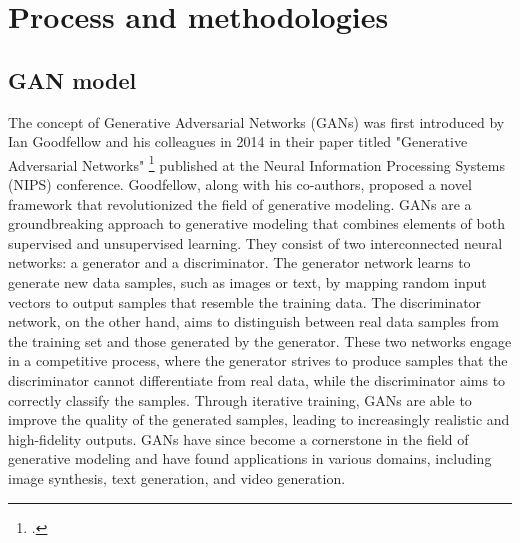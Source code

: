 \chapter{Process and methodologies}
\label{cap:process-methodologies}

\section{GAN model}
\label{sec:gan-model}
The concept of Generative Adversarial Networks (GANs) was first introduced by Ian Goodfellow and his colleagues in 2014 in their paper titled "Generative Adversarial Networks" \footcite{paper:ganpaper} published at the Neural Information Processing Systems (NIPS) conference. 
Goodfellow, along with his co-authors, proposed a novel framework that revolutionized the field of generative modeling. 
GANs are a groundbreaking approach to generative modeling that combines elements of both supervised and unsupervised learning. They consist of two interconnected neural networks: a generator and a discriminator. 
The generator network learns to generate new data samples, such as images or text, by mapping random input vectors to output samples that resemble the training data. 
The discriminator network, on the other hand, aims to distinguish between real data samples from the training set and those generated by the generator. 
These two networks engage in a competitive process, where the generator strives to produce samples that the discriminator cannot differentiate from real data, while the discriminator aims to correctly classify the samples. 
Through iterative training, GANs are able to improve the quality of the generated samples, leading to increasingly realistic and high-fidelity outputs. 
GANs have since become a cornerstone in the field of generative modeling and have found applications in various domains, including image synthesis, text generation, and video generation. 


%
%



